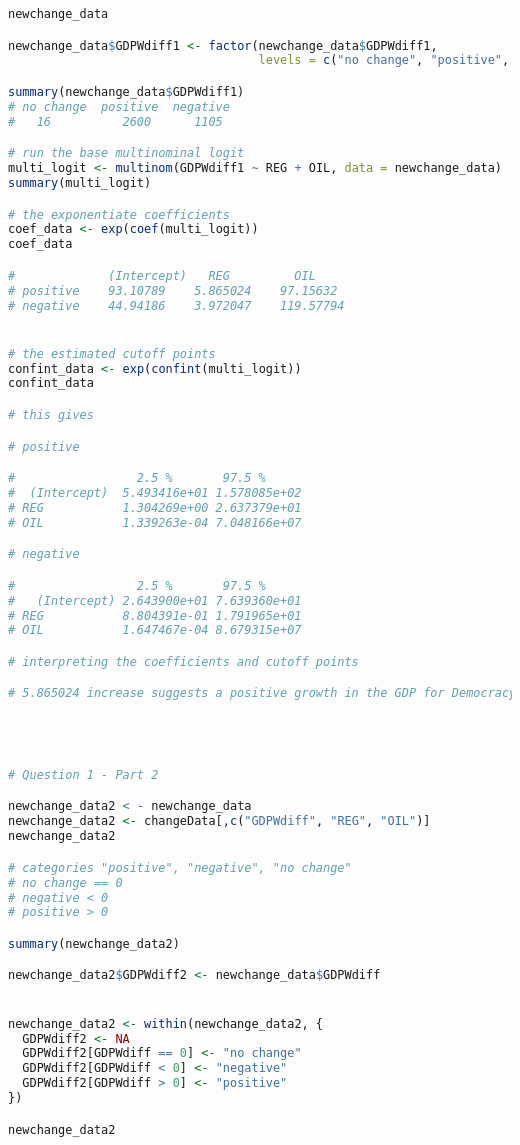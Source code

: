 \documentclass[12pt,letterpaper]{article}
\begin{document}
\begin{enumerate}
\begin{lstlisting}[language=R]
newchange_data

newchange_data$GDPWdiff1 <- factor(newchange_data$GDPWdiff1, 
                                   levels = c("no change", "positive", "negative"))

summary(newchange_data$GDPWdiff1)
# no change  positive  negative 
#   16          2600      1105 

# run the base multinominal logit
multi_logit <- multinom(GDPWdiff1 ~ REG + OIL, data = newchange_data)
summary(multi_logit)

# the exponentiate coefficients
coef_data <- exp(coef(multi_logit))
coef_data

#             (Intercept)   REG         OIL
# positive    93.10789    5.865024    97.15632
# negative    44.94186    3.972047    119.57794


# the estimated cutoff points 
confint_data <- exp(confint(multi_logit))
confint_data 

# this gives 

# positive

#                 2.5 %       97.5 %
#  (Intercept)  5.493416e+01 1.578085e+02
# REG           1.304269e+00 2.637379e+01
# OIL           1.339263e-04 7.048166e+07

# negative

#                 2.5 %       97.5 %
#   (Intercept) 2.643900e+01 7.639360e+01
# REG           8.804391e-01 1.791965e+01
# OIL           1.647467e-04 8.679315e+07

# interpreting the coefficients and cutoff points

# 5.865024 increase suggests a positive growth in the GDP for Democracy (REG: 1=Democracy)?




# Question 1 - Part 2

newchange_data2 < - newchange_data
newchange_data2 <- changeData[,c("GDPWdiff", "REG", "OIL")]
newchange_data2

# categories "positive", "negative", "no change"
# no change == 0
# negative < 0
# positive > 0

summary(newchange_data2)

newchange_data2$GDPWdiff2 <- newchange_data$GDPWdiff


newchange_data2 <- within(newchange_data2, {
  GDPWdiff2 <- NA
  GDPWdiff2[GDPWdiff == 0] <- "no change"
  GDPWdiff2[GDPWdiff < 0] <- "negative"
  GDPWdiff2[GDPWdiff > 0] <- "positive"
})

newchange_data2



\end{lstlisting}
\end{enumerate}
\end{document}
